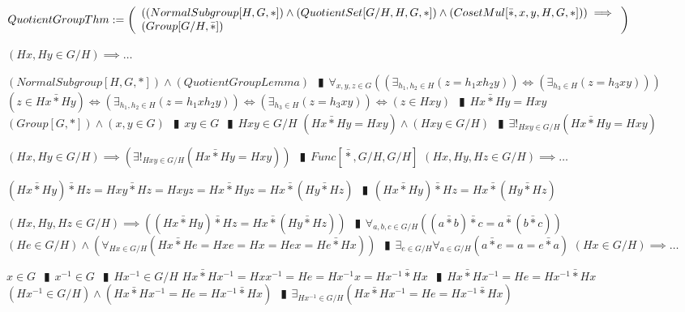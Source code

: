 \documentclass{book}
\newcommand{\abr}{:=}
\newcommand{\pipe}{$\phantom{(}\vrectangleblack\phantom{)}$}
\newcommand{\pr}[1]{\left(#1\right)}
\newcommand{\bbin}[1]{\mathbin{{\bar{#1}}}}
\begin{document}
$QuotientGroupThm \abr \left(\begin{array}{ll}
  \pr{(NormalSubgroup[H, G, *]) \hfill \land \hfill (QuotientSet[G / H, H, G, *]) \hfill \land \hfill (CosetMul[\bbin{*}, x, y, H, G, *])} \hfill \implies \hfill \\
  (Group[G / H, \bbin{*}])
\end{array}\right)$
\begin{enumerate}
  \lit $(H x, H y \in G / H) \implies \ldots$
  \begin{enumerate}
    \lit $(NormalSubgroup[H, G, *]) \land (QuotientGroupLemma)$ \pipe $\forall_{x, y, z \in G}\pr{\pr{\exists_{h_1, h_2 \in H}(z = h_1 x h_2 y)} \iff \pr{\exists_{h_3 \in H}(z = h_3 x y)}}$
    \lit $(z \in H x \bbin{*} H y) \iff \pr{\exists_{h_1, h_2 \in H}(z = h_1 x h_2 y)} \iff \pr{\exists_{h_3 \in H}(z = h_3 x y)} \iff (z \in H x y)$ \pipe $H x \bbin{*} H y = H x y$
    \lit $(Group[G, *]) \land (x, y \in G)$ \pipe $x y \in G$ \pipe $H x y \in G / H$
    \lit $(H x \bbin{*} H y = H x y) \land (H x y \in G / H)$ \pipe $\exists!_{H x y \in G / H}(H x \bbin{*} H y = H x y)$
  \end{enumerate}
  \lit $(H x, H y \in G / H) \implies \pr{\exists!_{H x y \in G / H}(H x \bbin{*} H y = H x y)}$ \pipe $Func[\bbin{*}, G / H, G / H]$
  \lit $(H x, H y, H z \in G / H) \implies \ldots$
  \begin{enumerate}
    \lit $(H x \bbin{*} H y) \bbin{*} H z = H x y \bbin{*} H z = H x y z = H x \bbin{*} H y z = H x \bbin{*} (H y \bbin{*} H z)$ \pipe $(H x \bbin{*} H y) \bbin{*} H z = H x \bbin{*} (H y \bbin{*} H z)$
  \end{enumerate}
  \lit $(H x, H y, H z \in G / H) \implies \pr{(H x \bbin{*} H y) \bbin{*} H z = H x \bbin{*} (H y \bbin{*} H z)}$ \pipe $\forall_{a, b, c \in G / H}\pr{(a \bbin{*} b) \bbin{*} c = a \bbin{*} (b \bbin{*} c)}$
  \lit $(H e \in G / H) \land \pr{\forall_{H x \in G / H}(H x \bbin{*} H e = H x e = H x = H e x = H e \bbin{*} H x)}$ \pipe $\exists_{e \in G / H} \forall_{a \in G / H}(a \bbin{*} e = a = e \bbin{*} a)$
  \lit $(H x \in G / H) \implies \ldots$
  \begin{enumerate}
    \lit $x \in G$ \pipe $x^{-1} \in G$ \pipe $H x^{-1} \in G / H$
    \lit $H x \bbin{*} H x^{-1} = H x x^{-1} = H e = H x^{-1} x = H x^{-1} \bbin{*} H x$ \pipe $H x \bbin{*} H x^{-1} = H e = H x^{-1} \bbin{*} H x$
    \lit $(H x^{-1} \in G / H) \land (H x \bbin{*} H x^{-1} = H e = H x^{-1} \bbin{*} H x)$ \pipe $\exists_{H x^{-1} \in G / H}(H x \bbin{*} H x^{-1} = H e = H x^{-1} \bbin{*} H x)$

\end{enumerate}
\end{enumerate}
\end{document}
